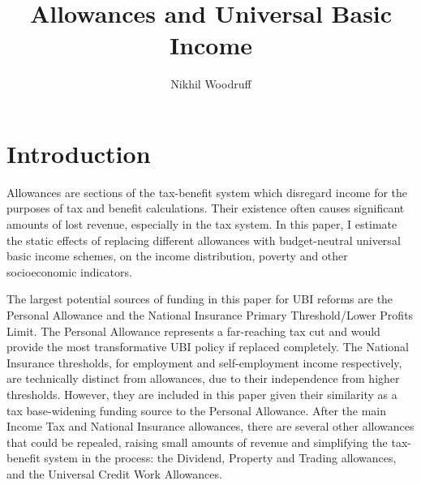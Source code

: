 \documentclass{article}
\title{Allowances and Universal Basic Income}
\author{Nikhil Woodruff}
\begin{document}
    \maketitle
    \tableofcontents
    \section{Introduction}
    Allowances are sections of the tax-benefit system which disregard income for the purposes of tax and benefit calculations. Their existence often causes significant amounts of lost revenue, especially in the tax system. In this paper, I estimate the static effects of replacing different allowances with budget-neutral universal basic income schemes, on the income distribution, poverty and other socioeconomic indicators.

    The largest potential sources of funding in this paper for UBI reforms are the Personal Allowance and the National Insurance Primary Threshold/Lower Profits Limit. The Personal Allowance represents a far-reaching tax cut and would provide the most transformative UBI policy if replaced completely. The National Insurance thresholds, for employment and self-employment income respectively, are technically distinct from allowances, due to their independence from higher thresholds. However, they are included in this paper given their similarity as a tax base-widening funding source to the Personal Allowance. After the main Income Tax and National Insurance allowances, there are several other allowances that could be repealed, raising small amounts of revenue and simplifying the tax-benefit system in the process: the Dividend, Property and Trading allowances, and the Universal Credit Work Allowances.
\end{document}
